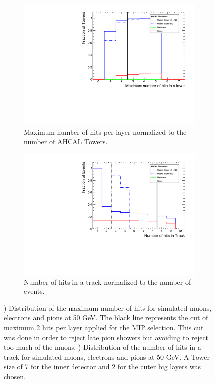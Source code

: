 \begin{figure}[htbp!]
	\begin{subfigure}[t]{0.45\textwidth}
		\centering
		\includegraphics[width=1\linewidth]{chap5/fig_AHCAL_timing/Muons/TrackFinderCut_nHitsLayer_Muons}
		\caption{Maximum number of hits per layer normalized to the number of AHCAL Towers.} \label{fig:Muons_Track_nHitsLayer}
	\end{subfigure}
	\hfill
	\begin{subfigure}[t]{0.45\textwidth}
		\centering
		\includegraphics[width=1\linewidth]{chap5/fig_AHCAL_timing/Muons/TrackFinderCut_nHitsTrack_Muons}
		\caption{Number of hits in a track normalized to the number of events.} \label{fig:Muons_Track_nHits}
	\end{subfigure}
	\caption{) Distribution of the maximum number of hits for simulated muons, electrons and pions at 50 GeV. The black line represents the cut of maximum 2 hits per layer applied for the MIP selection. This cut was done in order to reject late pion showers but avoiding to reject too much of the muons. ) Distribution of the number of hits in a track for simulated muons, electrons and pions at 50 GeV. A Tower size of 7 for the inner detector and 2 for the outer big layers was chosen.}
\end{figure}

